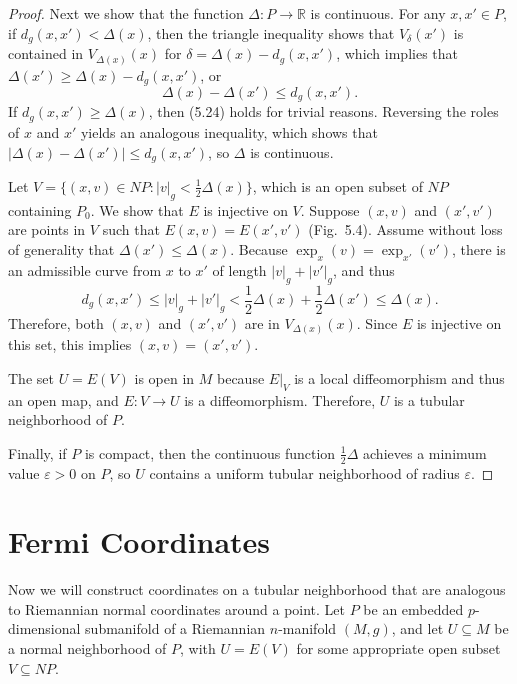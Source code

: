 \begin{theorem}
\begin{proof}
Next we show that the function $\Delta: P \to \mathbb{R}$ is continuous. For any $x, x' \in P$, if $d_g(x,x') < \Delta(x)$, then the triangle inequality shows that $V_\delta(x')$ is contained in $V_{\Delta(x)}(x)$ for $\delta = \Delta(x) - d_g(x,x')$, which implies that $\Delta(x') \geq \Delta(x) - d_g(x,x')$, or
\begin{equation}
\Delta(x) - \Delta(x') \leq d_g(x, x'). \tag{5.24}
\end{equation}
If $d_g(x, x') \geq \Delta(x)$, then (5.24) holds for trivial reasons. Reversing the roles of $x$ and $x'$ yields an analogous inequality, which shows that $|\Delta(x) - \Delta(x')| \leq d_g(x, x')$, so $\Delta$ is continuous.

Let $V = \{(x, v) \in NP : |v|_g < \frac{1}{2}\Delta(x)\}$, which is an open subset of $NP$ containing $P_0$. We show that $E$ is injective on $V$. Suppose $(x, v)$ and $(x', v')$ are points in $V$ such that $E(x, v) = E(x', v')$ (Fig.\ 5.4). Assume without loss of generality that $\Delta(x') \leq \Delta(x)$. Because $\exp_x(v) = \exp_{x'}(v')$, there is an admissible curve from $x$ to $x'$ of length $|v|_g + |v'|_g$, and thus
\[
d_g(x, x') \leq |v|_g + |v'|_g < \frac{1}{2}\Delta(x) + \frac{1}{2}\Delta(x') \leq \Delta(x).
\]
Therefore, both $(x, v)$ and $(x', v')$ are in $V_{\Delta(x)}(x)$. Since $E$ is injective on this set, this implies $(x, v) = (x', v')$.

The set $U = E(V)$ is open in $M$ because $E|_V$ is a local diffeomorphism and thus an open map, and $E: V \to U$ is a diffeomorphism. Therefore, $U$ is a tubular neighborhood of $P$.

Finally, if $P$ is compact, then the continuous function $\frac{1}{2}\Delta$ achieves a minimum value $\varepsilon > 0$ on $P$, so $U$ contains a uniform tubular neighborhood of radius $\varepsilon$.
\end{proof}
\end{theorem}

\section{Fermi Coordinates}

Now we will construct coordinates on a tubular neighborhood that are analogous to Riemannian normal coordinates around a point. Let $P$ be an embedded $p$-dimensional submanifold of a Riemannian $n$-manifold $(M, g)$, and let $U \subseteq M$ be a normal neighborhood of $P$, with $U = E(V)$ for some appropriate open subset $V \subseteq NP$.

